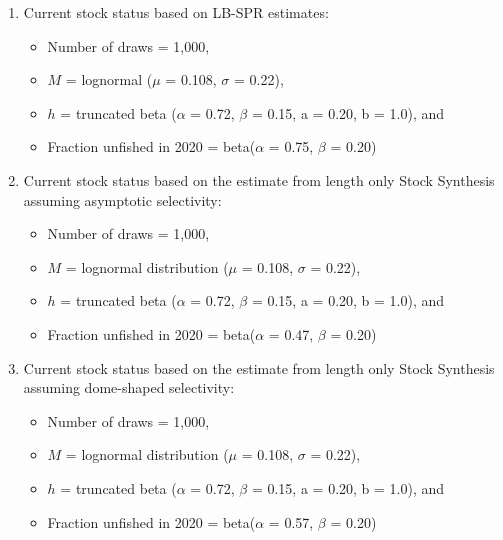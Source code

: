 \documentclass[11pt,
  english,
  a4paper,
]{article}
\begin{document}
\begin{enumerate}  
    \item Current stock status based on LB-SPR estimates: 
        \begin{itemize}
        \item Number of draws = 1,000,
        \item $M$ = lognormal ($\mu$ = 0.108, $\sigma$ = 0.22),
        \item $h$ = truncated beta ($\alpha$ = 0.72, $\beta$ = 0.15, a = 0.20, b = 1.0), and
        \item Fraction unfished in 2020 = beta($\alpha$ = 0.75, $\beta$ = 0.20) 
    \end{itemize}
    \item Current stock status based on the estimate from length only Stock Synthesis assuming asymptotic selectivity:
    \begin{itemize}
        \item Number of draws = 1,000,
        \item $M$ = lognormal distribution ($\mu$ = 0.108, $\sigma$ = 0.22),
        \item $h$ = truncated beta ($\alpha$ = 0.72, $\beta$ = 0.15, a = 0.20, b = 1.0), and
        \item Fraction unfished in 2020 = beta($\alpha$ = 0.47, $\beta$ = 0.20)
    \end{itemize}   
    \item Current stock status based on the estimate from length only Stock Synthesis assuming dome-shaped selectivity:
    \begin{itemize}
        \item Number of draws = 1,000,
        \item $M$ = lognormal distribution ($\mu$ = 0.108, $\sigma$ = 0.22),
        \item $h$ = truncated beta ($\alpha$ = 0.72, $\beta$ = 0.15, a = 0.20, b = 1.0), and
        \item Fraction unfished in 2020 = beta($\alpha$ = 0.57, $\beta$ = 0.20)
    \end{itemize}
\end{enumerate}

\end{document}
